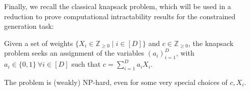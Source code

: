 Finally, we recall the classical knapsack problem,  which will be used in a reduction to prove computational intractability results for the constrained generation task: 
\begin{definition}
Given a set of weights $\{X_i \in \mathbb{Z}_{\geq 0} \mid i \in [D]\}$ and $c \in \mathbb{Z}_{\geq 0}$, the knapsack problem seeks an assignment of the variables $(a_i)_{i=1}^D$, with $a_i \in \{0,1\} \ \forall i \in [D]$ such that $c = \sum_{i=1}^{D} a_i X_i$.

\label{d:knapsack}
\end{definition}

The problem is (weakly) NP-hard, even for some very special choices of $c, X_i$. 


